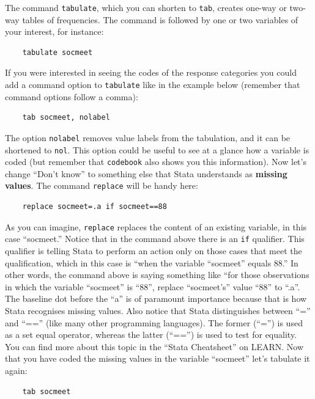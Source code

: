 The command \texttt{tabulate}, which you can shorten to \texttt{tab}, creates one-way or two-way tables of frequencies. The command is followed by one or two variables of your interest, for instance:

\begin{lstlisting}
	tabulate socmeet
\end{lstlisting}

If you were interested in seeing the codes of the response categories you could add a command option to \texttt{tabulate} like in the example below (remember that command options follow a comma):

\begin{lstlisting}
	tab socmeet, nolabel
\end{lstlisting}

The option \texttt{nolabel} removes value labels from the tabulation, and it can be shortened to \texttt{nol}. This option could be useful to see at a glance how a variable is coded (but remember that \texttt{codebook} also shows you this information). Now let's change ``Don't know'' to something else that Stata understands as \textbf{missing values}. The command \texttt{replace} will be handy here:

\begin{lstlisting}
	replace socmeet=.a if socmeet==88
\end{lstlisting}

As you can imagine, \texttt{replace} replaces the content of an existing variable, in this case ``socmeet.'' Notice that in the command above there is an \texttt{if} qualifier. This qualifier is telling Stata to perform an action only on those cases that meet the qualification, which in this case is ``when the variable ``socmeet'' equals 88.'' In other words, the command above is saying something like ``for those observations in which the variable ``socmeet'' is ``88'', replace ``socmeet's'' value ``88'' to ``.a''. The baseline dot before the ``a'' is of paramount importance because that is how Stata recognises missing values. Also notice that Stata distinguishes between ``='' and ``=='' (like many other programming languages). The former (``='') is used as a set equal operator, whereas the latter (``=='') is used to test for equality. You can find more about this topic in the ``Stata Cheatsheet'' on LEARN. Now that you have coded the missing values in the variable ``socmeet'' let's tabulate it again:

\begin{lstlisting}
	tab socmeet
\end{lstlisting}

